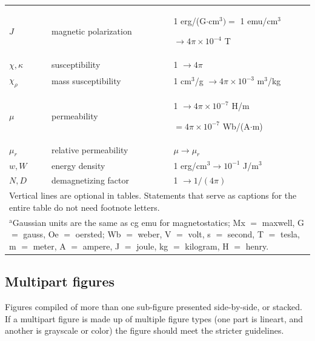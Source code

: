 \documentclass{ieeeaccess}
\begin{document}
\begin{table}
\begin{tabular}{|p{25pt}|p{75pt}|p{115pt}|}
        $J$                                            &
        magnetic polarization                          &
        1 erg/(G$\cdot $cm$^{3}) =$ 1 emu/cm$^{3}$ \par $\to 4\pi \times  10^{-4}$ T    \\
        $\chi , \kappa $                               &
        susceptibility                                 &
        1 $\to  4\pi $                                                                  \\
        $\chi_{\rho }$                                 &
        mass susceptibility                            &
        1 cm$^{3}$/g $\to  4\pi \times  10^{-3}$ m$^{3}$/kg                             \\
        $\mu $                                         &
        permeability                                   &
        1 $\to  4\pi \times  10^{-7}$ H/m \par $= 4\pi \times  10^{-7}$ Wb/(A$\cdot $m) \\
        $\mu_{r}$                                      &
        relative permeability                          &
        $\mu \to \mu_{r}$                                                               \\
        $w, W$                                         &
        energy density                                 &
        1 erg/cm$^{3} \to  10^{-1}$ J/m$^{3}$                                           \\
        $N, D$                                         &
        demagnetizing factor                           &
        1 $\to  1/(4\pi )$                                                              \\
        \hline
        \multicolumn{3}{p{251pt}}{Vertical lines are optional in tables. Statements that serve as captions for
        the entire table do not need footnote letters. }                                \\
        \multicolumn{3}{p{251pt}}{$^{\mathrm{a}}$Gaussian units are the same as cg emu for magnetostatics; Mx
            $=$ maxwell, G $=$ gauss, Oe $=$ oersted; Wb $=$ weber, V $=$ volt, s $=$
            second, T $=$ tesla, m $=$ meter, A $=$ ampere, J $=$ joule, kg $=$
            kilogram, H $=$ henry.}
    \end{tabular}
    \label{tab1}
\end{table}

\subsection{Multipart figures}
Figures compiled of more than one sub-figure presented side-by-side, or
stacked. If a multipart figure is made up of multiple figure
types (one part is lineart, and another is grayscale or color) the figure
should meet the stricter guidelines.
\end{document}
